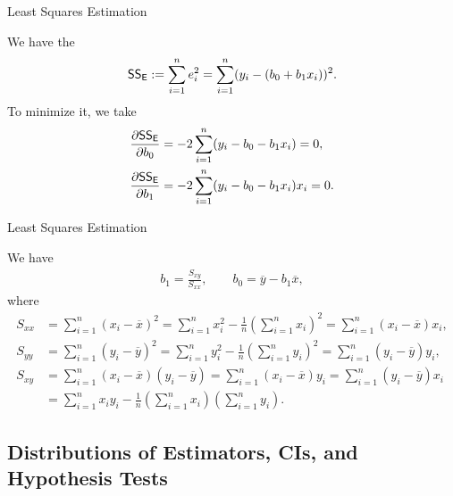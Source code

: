 \begin{frame}{Least Squares Estimation}

\justifying
{} We have the 
\begin{align*}
\mathsf{SS_E} := \sum_{i=1}^n e_i^2 = \sum_{i=1}^n (y_i-(b_0+b_1x_i))^2.
\end{align*}
To minimize it, we take
\begin{align*}
\frac{\partial \mathsf{SS_E}}{\partial b_0} & = -2\sum_{i=1}^n (y_i-b_0-b_1x_i) = 0, \\
\frac{\partial \mathsf{SS_E}}{\partial b_1} & = -2\sum_{i=1}^n (y_i-b_0-b_1x_i)x_i = 0.
\end{align*}

\end{frame}


\begin{frame}{Least Squares Estimation}

\justifying
{} We have 
\begin{align*}
b_1 = \frac{S_{xy}}{S_{xx}}, \qquad b_0 = \overline{y} - b_1\overline{x},
\end{align*}
where
\footnotesize
\begin{align*}
S_{xx} & = \sum_{i=1}^n (x_i - \overline{x})^2 = \sum_{i=1}^n x_i^2 - \frac{1}{n}\left(\sum_{i=1}^n x_i\right)^2 = \sum_{i=1}^n (x_i - \overline{x})x_i, \\
S_{yy} & = \sum_{i=1}^n (y_i - \overline{y})^2 = \sum_{i=1}^n y_i^2 - \frac{1}{n}\left(\sum_{i=1}^n y_i\right)^2 = \sum_{i=1}^n (y_i - \overline{y})y_i, \\
S_{xy} & = \sum_{i=1}^n (x_i - \overline{x})(y_i - \overline{y}) = \sum_{i=1}^n (x_i - \overline{x})y_i = \sum_{i=1}^n (y_i - \overline{y})x_i \\
& = \sum_{i=1}^n x_iy_i - \frac{1}{n}\left(\sum_{i=1}^n x_i \right)\left(\sum_{i=1}^n y_i \right).
\end{align*}

\end{frame}


\subsection{Distributions of Estimators, CIs, and Hypothesis Tests}

